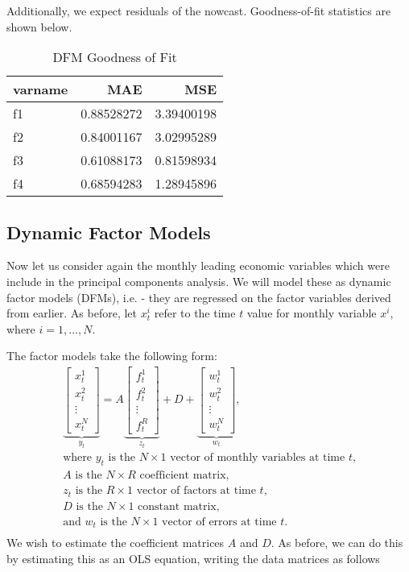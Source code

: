\documentclass[11pt, letterpaper]{article}\usepackage[]{graphicx}\usepackage[]{color}
\begin{document}
Additionally, we expect residuals of the nowcast. Goodness-of-fit statistics are shown below.
\begin{table}[H]
\centering
\begingroup\footnotesize
\begin{tabular}{lrr}
  \hline
varname & MAE & MSE \\ 
  \hline
f1 & 0.88528272 & 3.39400198 \\ 
  f2 & 0.84001167 & 3.02995289 \\ 
  f3 & 0.61088173 & 0.81598934 \\ 
  f4 & 0.68594283 & 1.28945896 \\ 
   \hline
\end{tabular}
\endgroup
\caption{DFM Goodness of Fit} 
\end{table}




\subsection{Dynamic Factor Models}
Now let us consider again the monthly leading economic variables which were include in the principal components analysis. We will model these as dynamic factor models (DFMs), i.e. - they are regressed on the factor variables derived from earlier. As before, let $x^i_t$ refer to the time $t$ value for monthly variable $x^i$, where $i = 1, \dots, N$.

The factor models take the following form:
\begin{align*}
\underbrace{\begin{bmatrix}
	x^1_t\\
	x^2_t\\
	\vdots \\
	x^N_t
\end{bmatrix}}_{y_t}
=
A
\underbrace{\begin{bmatrix}
	f^1_{t}\\
	f^2_{t}\\
	\vdots \\
	f^R_{t}
\end{bmatrix}}_{z_t}
+
D 
+
\underbrace{\begin{bmatrix}
	w^1_t\\
	w^2_t\\
	\vdots\\
	w^N_t
\end{bmatrix}}_{w_t},\\
\text{where $y_t$ is the $N \times 1$ vector of monthly variables at time $t$,}\\
\text{$A$ is the $N \times R$ coefficient matrix,}\\
\text{$z_t$ is the $R \times 1$ vector of factors at time $t$,}\\
\text{$D$ is the $N \times 1$ constant matrix,}\\
\text{and $w_t$ is the $N \times 1$ vector of errors at time $t$.}\\
\end{align*}
We wish to estimate the coefficient matrices $A$ and $D$. As before, we can do this by estimating this as an OLS equation, writing the data matrices as follows
\end{document}
